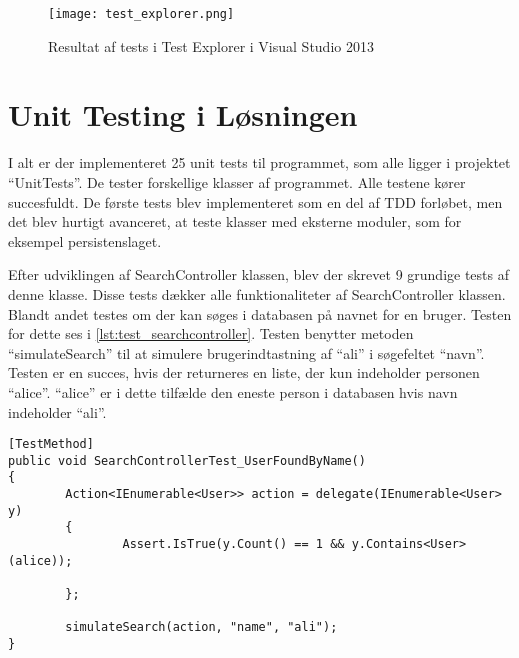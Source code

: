 \begin{figure}
  \centering
  \texttt{[image: test\_explorer.png]}
  \caption{Resultat af tests i Test Explorer i Visual Studio 2013}
  \label{fig:test_explorer}
\end{figure}

\section{Unit Testing i Løsningen}

I alt er der implementeret 25 unit tests til programmet, som alle ligger i projektet \enquote{UnitTests}. De tester forskellige klasser af programmet. Alle testene kører succesfuldt. De første tests blev implementeret som en del af TDD forløbet, men det blev hurtigt avanceret, at teste klasser med eksterne moduler, som for eksempel persistenslaget. 

Efter udviklingen af SearchController klassen, blev der skrevet 9 grundige tests af denne klasse. Disse tests dækker alle funktionaliteter af SearchController klassen. Blandt andet testes om der kan søges i databasen på navnet for en bruger. Testen for dette ses i \cref{lst:test_searchcontroller}. Testen benytter metoden \enquote{simulateSearch} til at simulere brugerindtastning af \enquote{ali} i søgefeltet \enquote{navn}. Testen er en succes, hvis der returneres en liste, der kun indeholder personen \enquote{alice}. \enquote{alice} er i dette tilfælde den eneste person i databasen hvis navn indeholder \enquote{ali}.

\begin{lstlisting}[label=lst:test_searchcontroller, caption={Eksempel på testfunktion}]
[TestMethod]
public void SearchControllerTest_UserFoundByName()
{
        Action<IEnumerable<User>> action = delegate(IEnumerable<User> y)
        {
                Assert.IsTrue(y.Count() == 1 && y.Contains<User>(alice));

        };

        simulateSearch(action, "name", "ali");
}
\end{lstlisting}
